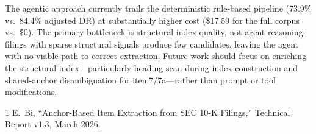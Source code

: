 \documentclass[11pt,a4paper]{article}
\begin{document}
The agentic approach currently trails the deterministic rule-based pipeline (73.9\% vs.\ 84.4\% adjusted DR) at substantially higher cost (\$17.59 for the full corpus vs.\ \$0). The primary bottleneck is structural index quality, not agent reasoning: filings with sparse structural signals produce few candidates, leaving the agent with no viable path to correct extraction. Future work should focus on enriching the structural index---particularly heading scan during index construction and shared-anchor disambiguation for item7/7a---rather than prompt or tool modifications.

\begin{thebibliography}{1}
E.~Bi, ``Anchor-Based Item Extraction from SEC 10-K Filings,'' Technical Report v1.3, March 2026.
\end{thebibliography}
\end{document}
